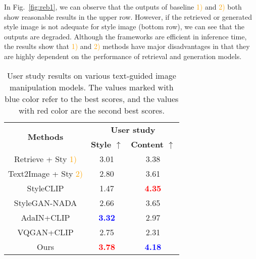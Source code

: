 \documentclass[10pt,twocolumn,letterpaper]{article}
\begin{document}
In Fig.~\ref{fig:reb1}, we can observe that the outputs of baseline \textcolor{orange}{1)} and \textcolor{orange}{2)} both show reasonable results in the upper row. However, if the retrieved or generated style image is not adequate for style image (bottom row), we can see that the outputs are degraded. Although the frameworks are efficient in inference time, the results show that \textcolor{orange}{1)} and \textcolor{orange}{2)} methods have major disadvantages in that they are highly dependent on the performance of retrieval and generation models. 


\begin{table}[!t]
\begin{center}

\centering
		\begin{adjustbox}{width=0.35\textwidth}
		\begin{tabular}[b]{c|cc}
        \multirow{2}{*}{\textbf{Methods}}&\multicolumn{2}{c}{\textbf{User study}}\\
      & \textbf{Style $\uparrow$} & \textbf{Content $\uparrow$} \\ \hline
      Retrieve + Sty \textcolor{orange}{1)} & 3.01& 3.38\\
      Text2Image + Sty \textcolor{orange}{2)} & 2.80& 3.61 \\
      \hdashline
      StyleCLIP & 1.47&\textcolor{red}{\textbf{4.35}}\\
      StyleGAN-NADA & 2.66&3.65\\
      \hdashline
      AdaIN+CLIP &\textcolor{blue}{\textbf{3.32}}&2.97\\
      VQGAN+CLIP & 2.75&2.31\\
      \hdashline
      Ours & \textcolor{red}{\textbf{3.78}}& \textcolor{blue}{\textbf{4.18}} \\
    \hline
    \end{tabular}
    \end{adjustbox}

\end{center}
\vspace*{-.3cm}
\caption{User study results on various text-guided image manipulation models. The values marked with blue color refer to  the best scores, and the values with red color are the second best scores.}

\vspace*{-.3cm}
\label{table:user}
\end{table}
\end{document}
